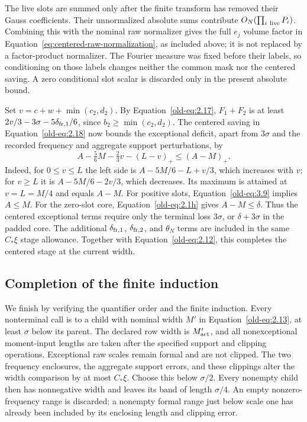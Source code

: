 \documentclass[12pt]{article}
\begin{document}
The live slots are summed only after the finite transform has removed
their Gauss coefficients.  Their unnormalized absolute sums contribute
\(O_N(\prod_{i\ {\rm live}}P_i)\).  Combining this with the nominal
raw normalizer gives the full \(e_j\) volume factor in
Equation~\eqref{eq:centered-raw-normalization}, as included above; it
is not replaced by a factor-product normalizer.  The Fourier measure was fixed before
their labels, so conditioning on those labels changes neither the
common mask nor the centered saving.  A zero conditional slot scalar
is discarded only in the present absolute bound.

Set \(v=c+w+\min(c_2,d_2)\).  By
Equation~\eqref{old-eq:2.17}, \(F_1+F_2\) is at least
\(2v/3-3\sigma-5\delta_{{\rm fr},1}/6\), since
\(b_2\ge\min(c_2,d_2)\).
The centered saving in Equation~\eqref{old-eq:2.18} now bounds
the exceptional deficit, apart from \(3\sigma\) and the recorded
frequency and aggregate support perturbations, by
\begin{equation}
 A-\tfrac56M-\tfrac23v-(L-v)_+
 \le (A-M)_+.
 \label{old-eq:2.19}
\end{equation}
Indeed, for \(0\le v\le L\) the left side is
\(A-5M/6-L+v/3\), which increases with \(v\); for
\(v\ge L\) it is \(A-5M/6-2v/3\), which decreases.
Its maximum is attained at \(v=L=M/4\) and equals \(A-M\).
For positive slots, Equation~\eqref{old-eq:3.9} implies
\(A\le M\).  For the zero-slot core,
Equation~\eqref{old-eq:2.1h} gives \(A-M\le\delta\).
Thus the centered exceptional terms require only the terminal
loss \(3\sigma\), or \(\delta+3\sigma\) in the padded core.
The additional \(\delta_{{\rm fr},1}\), \(\delta_{{\rm fr},2}\),
and \(\theta_N\) terms are included in the same \(C_*\xi\)
stage allowance.
Together with Equation~\eqref{old-eq:2.12}, this completes the
centered stage at the current width.

\subsection{Completion of the finite induction}

We finish by verifying the quantifier order and the finite induction.
Every nonterminal call is to a child with nominal width \(M'\) in
Equation~\eqref{old-eq:2.13}, at least \(\sigma\) below its parent.
The declared row width is \(M'_{\rm act}\), and all nonexceptional
moment-input lengths are taken after the specified support and clipping
operations.  Exceptional raw scales remain formal and are not clipped.
The two frequency enclosures, the aggregate support errors, and these
clippings alter the width comparison by at most \(C_*\xi\).  Choose
this below \(\sigma/2\).  Every nonempty child then has nonnegative
width and leaves its band of length \(\sigma/4\).  An empty
nonzero-frequency range is discarded; a nonempty formal range just
below scale one has already been included by its enclosing length and
clipping error.
\end{document}
